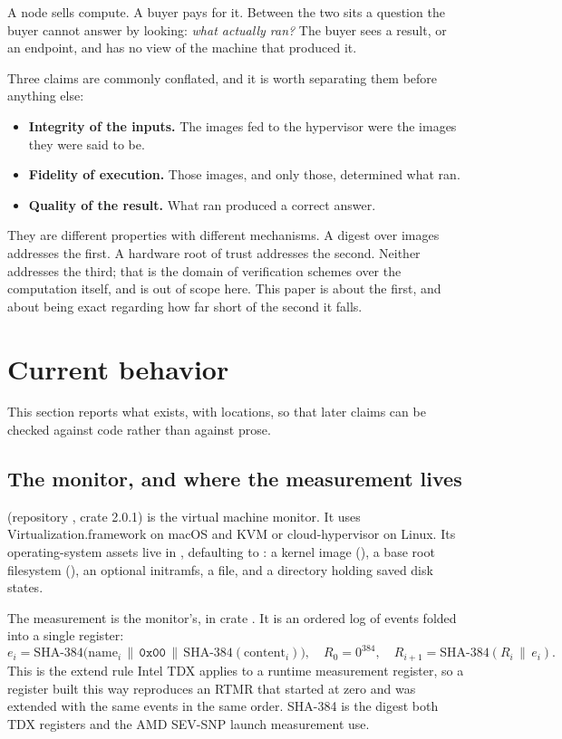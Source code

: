 \documentclass[11pt]{article}
\theoremstyle{definition}
\begin{document}
A node sells compute. A buyer pays for it. Between the two sits a question the
buyer cannot answer by looking: \emph{what actually ran?} The buyer sees a
result, or an endpoint, and has no view of the machine that produced it.

Three claims are commonly conflated, and it is worth separating them before
anything else:

\begin{itemize}[leftmargin=1.4em]
  \item \textbf{Integrity of the inputs.} The images fed to the hypervisor were
    the images they were said to be.
  \item \textbf{Fidelity of execution.} Those images, and only those, determined
    what ran.
  \item \textbf{Quality of the result.} What ran produced a correct answer.
\end{itemize}

They are different properties with different mechanisms. A digest over images
addresses the first. A hardware root of trust addresses the second. Neither
addresses the third; that is the domain of verification schemes over the
computation itself, and is out of scope here. This paper is about the first, and
about being exact regarding how far short of the second it falls.

\section{Current behavior}

This section reports what exists, with locations, so that later claims can be
checked against code rather than against prose.

\subsection{The monitor, and where the measurement lives}
\label{sec:monitor}

 (repository , crate  2.0.1) is
the virtual machine monitor. It uses Virtualization.framework on macOS and KVM
or cloud-hypervisor on Linux. Its operating-system assets live in
, defaulting to : a kernel image
(), a base root filesystem (), an optional
initramfs, a  file, and a  directory holding
saved disk states.

The measurement is the monitor's, in crate . It is an ordered
log of events folded into a single register:
\[
  e_i = \mathrm{SHA\text{-}384}\bigl(\mathrm{name}_i \,\|\, \texttt{0x00} \,\|\,
        \mathrm{SHA\text{-}384}(\mathrm{content}_i)\bigr), \quad
  R_0 = 0^{384}, \quad
  R_{i+1} = \mathrm{SHA\text{-}384}(R_i \,\|\, e_i).
\]
This is the extend rule Intel TDX applies to a runtime measurement register, so
a register built this way reproduces an RTMR that started at zero and was
extended with the same events in the same order. SHA-384 is the digest both TDX
registers and the AMD SEV-SNP launch measurement use.
\end{document}
